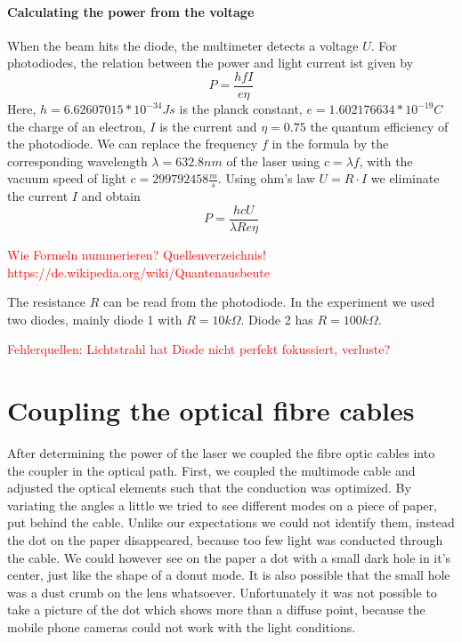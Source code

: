 \documentclass{article}
\begin{document}
\paragraph{Calculating the power from the voltage}

When the beam hits the diode, the multimeter detects a voltage $U$. For photodiodes, the relation between the power and light current ist given by 
\begin{equation} 
P = \frac{hfI}{e\eta}
\end{equation}
Here, $h = 6.62607015*10^{-34} Js$ is the planck constant, $e = 1.602176634*10^{-19} C$ the charge of an electron, $I$ is the current and $\eta = 0.75$ the quantum efficiency of the photodiode. We can replace the frequency $f$ in the formula by the corresponding wavelength $\lambda = 632.8 nm$ of the laser using $c= \lambda f$, with the vacuum speed of light  $c = 299792458 \frac{m}{s}$. Using ohm's law $ U= R \cdot I$ we eliminate the current $I$ and obtain 
\begin{equation}
P = \frac{hcU}{\lambda Re \eta}
\end{equation}

\textcolor{red}{Wie Formeln nummerieren? Quellenverzeichnis! https://de.wikipedia.org/wiki/Quantenausbeute}

The resistance $R$ can be read from the photodiode. In the experiment we used two diodes, mainly diode 1 with $R=10 k\Omega$. Diode 2 has $R= 100 k\Omega$.

\textcolor{red}{Fehlerquellen: Lichtstrahl hat Diode nicht perfekt fokussiert, verluste?}

\section{Coupling the optical fibre cables}

After determining the power of the laser we coupled the fibre optic cables into the coupler in the optical path. First, we coupled the multimode cable and adjusted the optical elements such that the conduction was optimized. By variating the angles a little we tried to see different modes on a piece of paper, put behind the cable. Unlike our expectations we could not identify them, instead the dot on the paper disappeared, because too few light was conducted through the cable. We could however see on the paper a dot with a small dark hole in it's center, just like the shape of a donut mode. It is also possible that the small hole was a dust crumb on the lens whatsoever. Unfortunately it was not possible to take a picture of the dot which shows more than a diffuse point, because the mobile phone cameras could not work with the light conditions.\\
\end{document}
